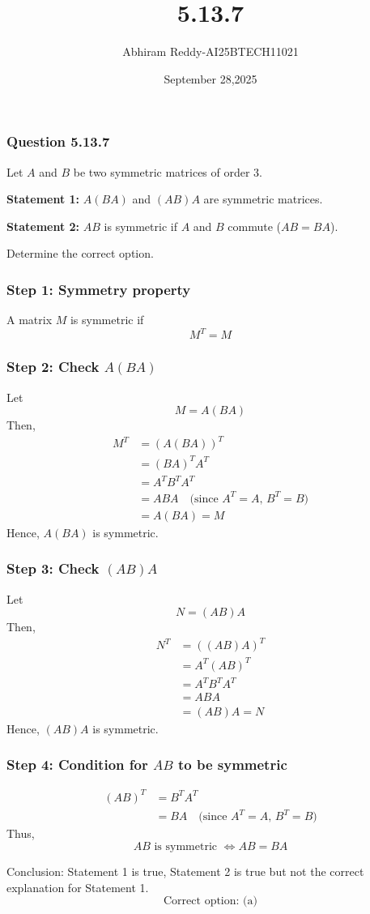 \documentclass{beamer}
\title 
{5.13.7}
\date{September 28,2025}
\author 
{Abhiram Reddy-AI25BTECH11021}
\begin{document}
\frame{\titlepage}

\begin{frame}
\frametitle{Question 5.13.7}
Let $A$ and $B$ be two symmetric matrices of order $3$.  

\textbf{Statement 1:} $A(BA)$ and $(AB)A$ are symmetric matrices.  

\textbf{Statement 2:} $AB$ is symmetric if $A$ and $B$ commute ($AB=BA$).  

Determine the correct option.
\end{frame}

\begin{frame}
\frametitle{Step 1: Symmetry property}
A matrix $M$ is symmetric if
\begin{equation}
M^T = M
\end{equation}
\end{frame}

\begin{frame}
\frametitle{Step 2: Check $A(BA)$}
Let 
\[
M = A(BA)
\]  
Then,
\begin{align}
M^T &= (A(BA))^T \\
&= (BA)^T A^T \\
&= A^T B^T A^T \\
&= A B A \quad \text{(since $A^T=A$, $B^T=B$)} \\
&= A(BA) = M
\end{align}
Hence, $A(BA)$ is symmetric.
\end{frame}

\begin{frame}
\frametitle{Step 3: Check $(AB)A$}
Let 
\[
N = (AB)A
\]  
Then,
\begin{align}
N^T &= ((AB)A)^T \\
&= A^T (AB)^T \\
&= A^T B^T A^T \\
&= ABA \\
&= (AB)A = N
\end{align}
Hence, $(AB)A$ is symmetric.
\end{frame}

\begin{frame}
\frametitle{Step 4: Condition for $AB$ to be symmetric}
\begin{align}
(AB)^T &= B^T A^T \\
&= BA \quad \text{(since $A^T=A$, $B^T=B$)}
\end{align}
Thus,
\begin{equation}
AB \text{ is symmetric } \iff AB = BA
\end{equation}

Conclusion: Statement 1 is true, Statement 2 is true but not the correct explanation for Statement 1.
\[
\boxed{\text{Correct option: (a)}}
\]
\end{frame}
\end{document}
